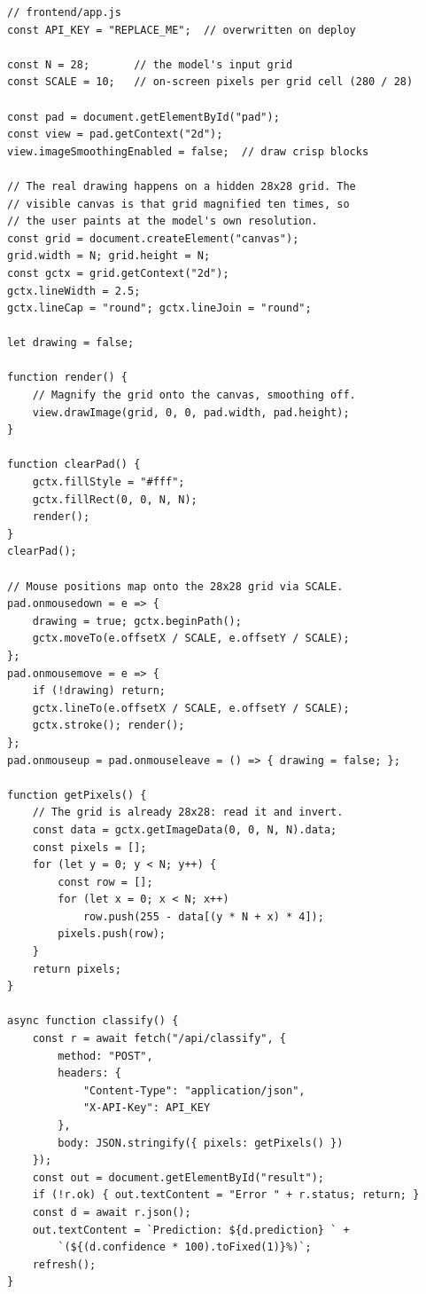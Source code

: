 \begin{verbatim}
// frontend/app.js
const API_KEY = "REPLACE_ME";  // overwritten on deploy

const N = 28;       // the model's input grid
const SCALE = 10;   // on-screen pixels per grid cell (280 / 28)

const pad = document.getElementById("pad");
const view = pad.getContext("2d");
view.imageSmoothingEnabled = false;  // draw crisp blocks

// The real drawing happens on a hidden 28x28 grid. The
// visible canvas is that grid magnified ten times, so
// the user paints at the model's own resolution.
const grid = document.createElement("canvas");
grid.width = N; grid.height = N;
const gctx = grid.getContext("2d");
gctx.lineWidth = 2.5;
gctx.lineCap = "round"; gctx.lineJoin = "round";

let drawing = false;

function render() {
    // Magnify the grid onto the canvas, smoothing off.
    view.drawImage(grid, 0, 0, pad.width, pad.height);
}

function clearPad() {
    gctx.fillStyle = "#fff";
    gctx.fillRect(0, 0, N, N);
    render();
}
clearPad();

// Mouse positions map onto the 28x28 grid via SCALE.
pad.onmousedown = e => {
    drawing = true; gctx.beginPath();
    gctx.moveTo(e.offsetX / SCALE, e.offsetY / SCALE);
};
pad.onmousemove = e => {
    if (!drawing) return;
    gctx.lineTo(e.offsetX / SCALE, e.offsetY / SCALE);
    gctx.stroke(); render();
};
pad.onmouseup = pad.onmouseleave = () => { drawing = false; };

function getPixels() {
    // The grid is already 28x28: read it and invert.
    const data = gctx.getImageData(0, 0, N, N).data;
    const pixels = [];
    for (let y = 0; y < N; y++) {
        const row = [];
        for (let x = 0; x < N; x++)
            row.push(255 - data[(y * N + x) * 4]);
        pixels.push(row);
    }
    return pixels;
}

async function classify() {
    const r = await fetch("/api/classify", {
        method: "POST",
        headers: {
            "Content-Type": "application/json",
            "X-API-Key": API_KEY
        },
        body: JSON.stringify({ pixels: getPixels() })
    });
    const out = document.getElementById("result");
    if (!r.ok) { out.textContent = "Error " + r.status; return; }
    const d = await r.json();
    out.textContent = `Prediction: ${d.prediction} ` +
        `(${(d.confidence * 100).toFixed(1)}%)`;
    refresh();
}


\end{verbatim}
